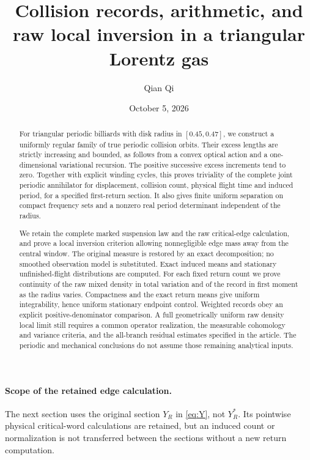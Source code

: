 \documentclass[11pt,reqno]{amsart}
\title[Collision records and raw local inversion]{Collision records, arithmetic, and raw local inversion in a triangular Lorentz gas}
\author{Qian Qi}
\date{October 5, 2026}
\numberwithin{equation}{section}
\theoremstyle{definition}\newtheorem{definition}[theorem]{Definition}
\theoremstyle{remark}\newtheorem{remark}[theorem]{Remark}
\begin{document}
\raggedbottom
\begin{abstract}
For triangular periodic billiards with disk radius in $[0.45,0.47]$, we
construct a uniformly regular family of true periodic collision orbits.
Their excess lengths are strictly increasing and bounded, as follows from
a convex optical action and a one-dimensional variational recursion. The
positive successive excess increments tend to zero. Together with explicit
winding cycles, this proves triviality of the complete joint periodic
annihilator for displacement, collision count, physical flight time and
induced period, for a specified first-return section. It also gives finite
uniform separation on compact frequency sets and a nonzero real period
determinant independent of the radius.

We retain the complete marked suspension law and the raw critical-edge
calculation, and prove a local inversion criterion allowing nonnegligible
edge mass away from the central window. The original measure is restored
by an exact decomposition; no smoothed observation model is substituted.
Exact induced means and stationary unfinished-flight distributions are
computed. For each fixed return count we prove continuity of the raw
mixed density in total variation and of the record in first moment as
the radius varies. Compactness and the exact return means give uniform
integrability, hence uniform stationary endpoint control. Weighted records
obey an explicit positive-denominator comparison. A full geometrically uniform raw density local limit still
requires a common operator realization, the measurable cohomology and
variance criteria, and the all-branch residual estimates specified in the
article. The periodic and mechanical conclusions do not assume those
remaining analytical inputs.
\end{abstract}
\maketitle





\paragraph{Scope of the retained edge calculation.}
The next section uses the original section $Y_R$ in \eqref{eq:Y}, not
$Y_R^*$. Its pointwise physical critical-word calculations are retained,
but an induced count or normalization is not transferred between the
sections without a new return computation.








\end{document}
